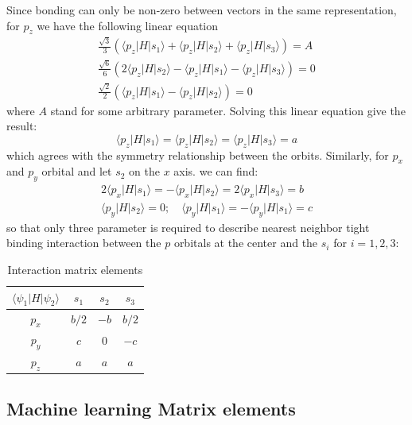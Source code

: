 \documentclass{article}
\begin{document}
Since bonding can only be non-zero between vectors in the same representation, for $p_z$ we have
the following linear equation
\begin{align*}
    \frac{\sqrt{3}}{3} (\langle p_z | H | s_1 \rangle + \langle p_z | H | s_2 \rangle + \langle p_z | H | s_3 \rangle) = A \\
    \frac{\sqrt{6}}{6} (2\langle p_z | H | s_2 \rangle - \langle p_z | H | s_1 \rangle - \langle p_z | H | s_3 \rangle) = 0 \\
    \frac{\sqrt{2}}{2} ( \langle p_z | H | s_1 \rangle - \langle p_z | H | s_2 \rangle) = 0
\end{align*}
where $A$ stand for some arbitrary parameter. Solving this linear 
equation give the result:
\begin{equation}
    \langle p_z | H | s_1 \rangle = \langle p_z | H | s_2 \rangle = \langle p_z | H | s_3 \rangle = a
\end{equation}
which agrees with the symmetry relationship between the orbits.
Similarly, for $p_x$ and $p_y$ orbital and let $s_2$ on the $x$ axis. we can find:
\begin{gather}
    2 \langle p_x | H | s_1 \rangle = - \langle p_x | H | s_2 \rangle = 2 \langle p_x | H | s_3 \rangle = b \\
    \langle p_y | H | s_2 \rangle = 0;\quad \langle p_y | H | s_1 \rangle = - \langle p_y | H | s_1 \rangle = c
\end{gather}
so that only three parameter is required to describe nearest neighbor tight binding interaction between the 
$p$ orbitals at the center and the $s_i$ for $i = 1,2,3$:
\begin{table}[h]
    \caption{Interaction matrix elements}
    \label{T:interaction_D_3h}
    \centering
    \begin{tabular}{|c|ccc|}
        \hline
        $\langle \psi_1 | H | \psi_2 \rangle$ & $s_1$ & $s_2$ & $s_3$ \\ \hline
        $p_x$ & $b/2$ & $-b$ & $b/2$ \\
        $p_y$ & $c$ & $0$ & $-c$\\
        $p_z$ & $a$ & $a$ & $a$ \\
        \hline
    \end{tabular}
\end{table}



\subsection{Machine learning Matrix elements}
\end{document}
